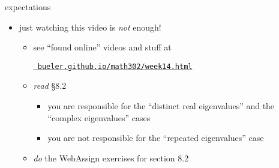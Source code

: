 \documentclass[urlcolor=blue,dvipsnames]{beamer}
\begin{document}
\begin{frame}{expectations}

\begin{itemize}
\item just watching this video is \emph{not} enough!
     \begin{itemize}
     \item see ``found online'' videos and stuff at

     \centerline{\href{https://bueler.github.io/math302/week14.html}{\tt \color{cyan} bueler.github.io/math302/week14.html}}
     \item \emph{read} \S8.2
         \begin{itemize}
         \item you \alert{are responsible} for the ``distinct real eigenvalues'' and the ``complex eigenvalues'' cases
         \item you are not responsible for the ``repeated eigenvalues'' case
         \end{itemize}
     \item \emph{do} the WebAssign exercises for section 8.2
     \end{itemize}
\end{itemize}
\end{frame}
\end{document}

